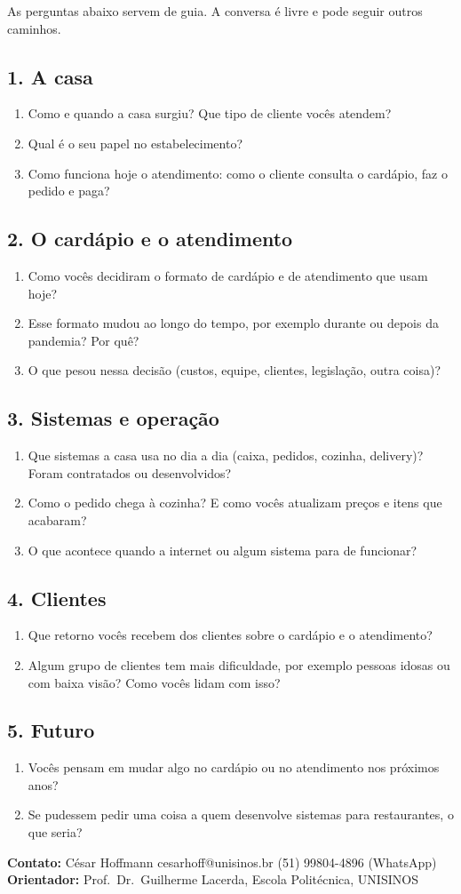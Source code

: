 \documentclass[11pt,a4paper]{article}
\newcommand{\tema}[1]{\subsection*{\normalsize #1}}
\begin{document}
As perguntas abaixo servem de guia. A conversa é livre e pode seguir outros caminhos.

\tema{1. A casa}
\begin{enumerate}
  \item Como e quando a casa surgiu? Que tipo de cliente vocês atendem?
  \item Qual é o seu papel no estabelecimento?
  \item Como funciona hoje o atendimento: como o cliente consulta o cardápio, faz o pedido e paga?
\end{enumerate}

\tema{2. O cardápio e o atendimento}
\begin{enumerate}[resume]
  \item Como vocês decidiram o formato de cardápio e de atendimento que usam hoje?
  \item Esse formato mudou ao longo do tempo, por exemplo durante ou depois da pandemia? Por quê?
  \item O que pesou nessa decisão (custos, equipe, clientes, legislação, outra coisa)?
\end{enumerate}

\tema{3. Sistemas e operação}
\begin{enumerate}[resume]
  \item Que sistemas a casa usa no dia a dia (caixa, pedidos, cozinha, delivery)? Foram contratados ou desenvolvidos?
  \item Como o pedido chega à cozinha? E como vocês atualizam preços e itens que acabaram?
  \item O que acontece quando a internet ou algum sistema para de funcionar?
\end{enumerate}

\tema{4. Clientes}
\begin{enumerate}[resume]
  \item Que retorno vocês recebem dos clientes sobre o cardápio e o atendimento?
  \item Algum grupo de clientes tem mais dificuldade, por exemplo pessoas idosas ou com baixa visão? Como vocês lidam com isso?
\end{enumerate}

\tema{5. Futuro}
\begin{enumerate}[resume]
  \item Vocês pensam em mudar algo no cardápio ou no atendimento nos próximos anos?
  \item Se pudessem pedir uma coisa a quem desenvolve sistemas para restaurantes, o que seria?
\end{enumerate}

\vspace{0.6em}
\textbf{Contato:} César Hoffmann \textbullet{} cesarhoff@unisinos.br \textbullet{} (51) 99804-4896 (WhatsApp)\\
\textbf{Orientador:} Prof.\ Dr.\ Guilherme Lacerda, Escola Politécnica, UNISINOS
\end{document}
